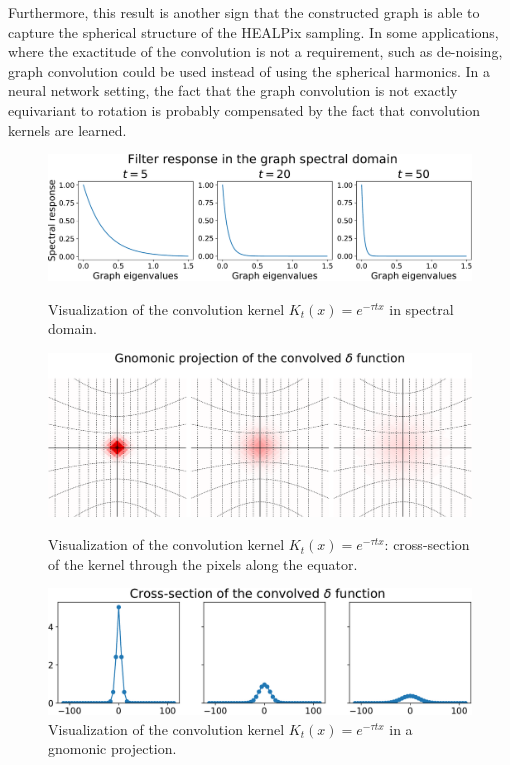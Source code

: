 \documentclass[final,twocolumn,3p,times,sort&compress]{elsarticle}
\newcommand{\1}{\b{1}}              %
\newcommand{\0}{\b{0}}              %
\begin{document}
Furthermore, this result is another sign that the constructed graph is able to capture the spherical
structure of the HEALPix sampling. In some applications, where the
exactitude of the convolution is not a requirement, such as de-noising, graph convolution could be used instead of using the spherical harmonics.
In a neural network setting, the fact that the graph convolution is not exactly equivariant to rotation is probably compensated by the fact that convolution kernels are learned.

\begin{figure}[ht!]
\centering
\includegraphics[width=\linewidth]{gaussian_filters_spectral}
\caption{Visualization of the convolution kernel $K_t(x)=e^{-\tau t x}$ in spectral domain.}
\vspace{0.3in}
\includegraphics[width=\linewidth]{gaussian_filters_gnomonic}
\caption{Visualization of the convolution kernel $K_t(x)=e^{-\tau t x}$: cross-section of the kernel through the pixels along the equator.}
\vspace{0.3in}
\includegraphics[width=\linewidth]{gaussian_filters_section}
\caption{Visualization of the convolution kernel $K_t(x)=e^{-\tau t x}$ in a gnomonic projection.}
\label{fig:gaussian_filters_visualization}
\end{figure}
\end{document}
